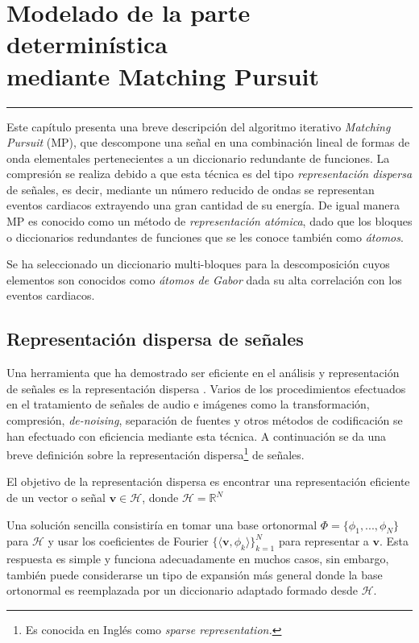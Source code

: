 \chapter{Modelado de la parte determinística \\ mediante Matching Pursuit}\label{capit:cap3}
\vspace{-2.0325ex}%
\noindent
\rule{\textwidth}{0.5pt}
\vspace{-5.5ex}%
\newcommand{\pushline}{\Indp}%


Este capítulo presenta una breve descripción del algoritmo iterativo \emph{Matching Pursuit} (MP), que descompone una señal en una combinación lineal de formas de onda elementales pertenecientes a un diccionario redundante de funciones. La compresión se realiza debido a que esta técnica es del tipo \emph{representación dispersa} de señales, es decir, mediante un número reducido de ondas se representan eventos cardiacos extrayendo una gran cantidad de su energía. De igual manera MP es conocido como un método de \emph{representación atómica}, dado que los bloques o diccionarios redundantes de funciones que se les conoce también como \emph{átomos}.

Se ha seleccionado un diccionario multi-bloques para la descomposición cuyos elementos son conocidos como \emph{átomos de Gabor} dada su alta correlación con los eventos cardiacos. 

\section{Representación dispersa de señales}

Una herramienta que ha demostrado ser eficiente en el análisis y representación de señales es la representación dispersa \cite[]{Gribonval2003,Gribonval2007,Elad2010,Mallat1993}. Varios de los procedimientos efectuados en el tratamiento de  señales de audio e imágenes como la transformación, compresión, \emph{de-noising}, separación de fuentes y otros métodos de codificación se han efectuado con eficiencia mediante esta técnica. A continuación se da una breve definición sobre la representación dispersa\footnote{Es conocida en Inglés como \emph{sparse representation.}} de señales.

El objetivo de la representación dispersa es encontrar una representación eficiente de un vector o señal $\mathbf{v} \in \mathcal{H}$, donde $\mathcal{H}=\mathbb{R}^{N}$

Una solución sencilla consistiría en tomar una base ortonormal $\Phi =\{ \phi_{1}, ..., \phi_{N}\}$ para $\mathcal{H}$ y usar los coeficientes de Fourier $\{\langle \mathbf{v},\phi_{k}\rangle\}_{k=1}^{N}$ para representar a $\mathbf{v}$. Esta respuesta es simple y funciona adecuadamente en muchos casos, sin embargo, también puede considerarse un tipo de expansión más general donde la base ortonormal es reemplazada por un diccionario adaptado formado desde $\mathcal{H}$. 

